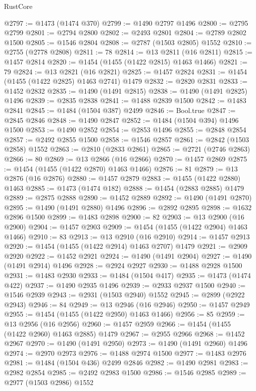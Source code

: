 \begin{lexlean}{RustCore}
\begin{coremodule}
@2797 := @1473 (@1474 @370)
@2799 := @1490 @2797 @1496
@2800 := @2795 @2799
@2801 := @2794 @2800
@2802 := @2493 @2801
@2804 := @2789 @2802 @1500
@2805 := @1546 @2804
@2808 := @2787 (@1503 @2805) @1552
@2810 := @2755 (@2778 @2808)
@2811 := 78
@2814 := @13 @2811 (@16 @2811)
@2815 := @1457 @2814
@2820 := @1454 (@1455 (@1422 @2815) @1463 @1466)
@2821 := 79
@2824 := @13 @2821 (@16 @2821)
@2825 := @1457 @2824
@2831 := @1454 (@1455 (@1422 @2825) @1463 @2741) @1479
@2832 := @2820 @2831
@2833 := @1452 @2832
@2835 := @1490 (@1491 @2815)
@2838 := @1490 (@1491 @2825) @1496
@2839 := @2835 @2838
@2841 := @1488 @2839 @1500
@2842 := @1483 @2841
@2845 := @1484 (@1504 @387) @2499
@2846 := Bool.true
@2847 := @2845 @2846
@2848 := @1490 @2847
@2852 := @1484 (@1504 @394) @1496 @1500
@2853 := @1490 @2852
@2854 := @2853 @1496
@2855 := @2848 @2854
@2857 := @2492 @2855 @1500
@2858 := @1546 @2857
@2861 := @2842 (@1503 @2858) @1552
@2863 := @2810 (@2833 @2861)
@2865 := @2721 (@2746 @2863)
@2866 := 80
@2869 := @13 @2866 (@16 @2866)
@2870 := @1457 @2869
@2875 := @1454 (@1455 (@1422 @2870) @1463 @1466)
@2876 := 81
@2879 := @13 @2876 (@16 @2876)
@2880 := @1457 @2879
@2883 := @1455 (@1422 @2880) @1463
@2885 := @1473 (@1474 @182)
@2888 := @1454 (@2883 @2885) @1479
@2889 := @2875 @2888
@2890 := @1452 @2889
@2892 := @1490 (@1491 @2870)
@2895 := @1490 (@1491 @2880) @1496
@2896 := @2892 @2895
@2898 := @1632 @2896 @1500
@2899 := @1483 @2898
@2900 := 82
@2903 := @13 @2900 (@16 @2900)
@2904 := @1457 @2903
@2909 := @1454 (@1455 (@1422 @2904) @1463 @1466)
@2910 := 83
@2913 := @13 @2910 (@16 @2910)
@2914 := @1457 @2913
@2920 := @1454 (@1455 (@1422 @2914) @1463 @2707) @1479
@2921 := @2909 @2920
@2922 := @1452 @2921
@2924 := @1490 (@1491 @2904)
@2927 := @1490 (@1491 @2914) @1496
@2928 := @2924 @2927
@2930 := @1488 @2928 @1500
@2931 := @1483 @2930
@2933 := @1484 (@1504 @417)
@2935 := @1473 (@1474 @422)
@2937 := @1490 @2935 @1496
@2939 := @2933 @2937 @1500
@2940 := @1546 @2939
@2943 := @2931 (@1503 @2940) @1552
@2945 := @2899 (@2922 @2943)
@2946 := 84
@2949 := @13 @2946 (@16 @2946)
@2950 := @1457 @2949
@2955 := @1454 (@1455 (@1422 @2950) @1463 @1466)
@2956 := 85
@2959 := @13 @2956 (@16 @2956)
@2960 := @1457 @2959
@2966 := @1454 (@1455 (@1422 @2960) @1463 @2885) @1479
@2967 := @2955 @2966
@2968 := @1452 @2967
@2970 := @1490 (@1491 @2950)
@2973 := @1490 (@1491 @2960) @1496
@2974 := @2970 @2973
@2976 := @1488 @2974 @1500
@2977 := @1483 @2976
@2981 := @1484 (@1504 @436) @2499 @2846
@2982 := @1490 @2981
@2983 := @2982 @2854
@2985 := @2492 @2983 @1500
@2986 := @1546 @2985
@2989 := @2977 (@1503 @2986) @1552

\end{coremodule}
\end{lexlean}
